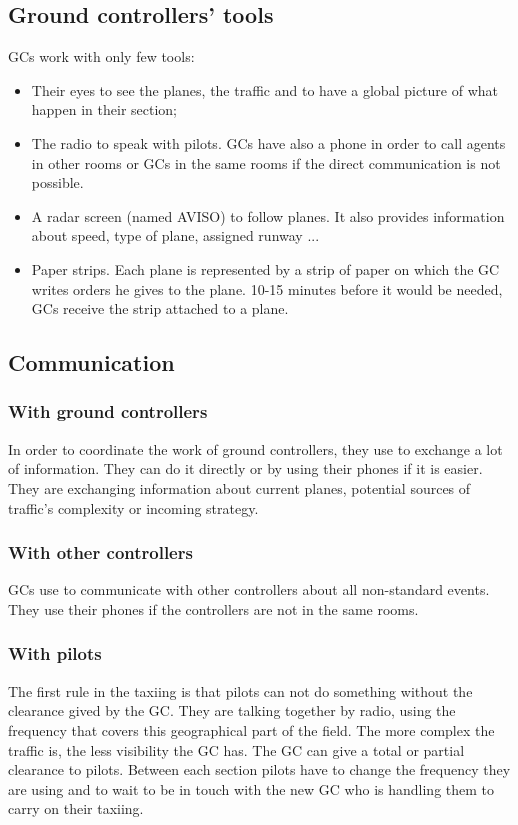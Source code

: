 \documentclass{article}
\begin{document}
\subsection{Ground controllers' tools}
GCs work with only few tools:
\begin{itemize}
    \item Their eyes to see the planes, the traffic and to have a global picture of what happen in their section;
    \item The radio to speak with pilots. GCs have also a phone in order to call agents in other rooms or GCs in the same rooms if the direct communication is not possible. 
    \item A radar screen (named AVISO) to follow planes. It also provides information about speed, type of plane, assigned runway ...
    \item Paper strips. Each plane is represented by a strip of paper on which the GC writes orders he gives to the plane. 10-15 minutes before it would be needed, GCs receive the strip attached to a plane. 
\end{itemize}
\subsection{Communication}
\subsubsection*{With ground controllers}
In order to coordinate the work of ground controllers, they use to exchange a lot of information. They can do it directly or by using their phones if it is easier. They are exchanging information about current planes, potential sources of traffic's complexity or incoming strategy.
\subsubsection*{With other controllers}
GCs use to communicate with other controllers about all non-standard events. They use their phones if the controllers are not in the same rooms.
\subsubsection*{With pilots}
The first rule in the taxiing is that pilots can not do something without the clearance gived by the GC. They are talking together by radio, using the frequency that covers this geographical part of the field. The more complex the traffic is, the less visibility the GC has. The GC can give a total or partial clearance to pilots. Between each section pilots have to change the frequency they are using and to wait to be in touch with the new GC who is handling them to carry on their taxiing. 
\end{document}
